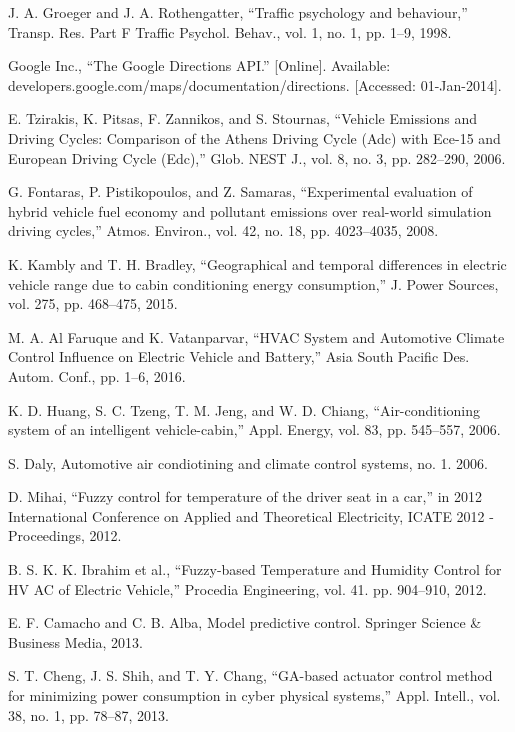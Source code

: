 J. A. Groeger and J. A. Rothengatter, “Traffic psychology and behaviour,” Transp. Res. Part F Traffic Psychol. Behav., vol. 1, no. 1, pp. 1–9, 1998.

Google Inc., “The Google Directions API.” [Online]. Available: developers.google.com/maps/documentation/directions. [Accessed: 01-Jan-2014].

E. Tzirakis, K. Pitsas, F. Zannikos, and S. Stournas, “Vehicle Emissions and Driving Cycles: Comparison of the Athens Driving Cycle (Adc) with Ece-15 and European Driving Cycle (Edc),” Glob. NEST J., vol. 8, no. 3, pp. 282–290, 2006.

G. Fontaras, P. Pistikopoulos, and Z. Samaras, “Experimental evaluation of hybrid vehicle fuel economy and pollutant emissions over real-world simulation driving cycles,” Atmos. Environ., vol. 42, no. 18, pp. 4023–4035, 2008.

K. Kambly and T. H. Bradley, “Geographical and temporal differences in electric vehicle range due to cabin conditioning energy consumption,” J. Power Sources, vol. 275, pp. 468–475, 2015.

M. A. Al Faruque and K. Vatanparvar, “HVAC System and Automotive Climate Control Influence on Electric Vehicle and Battery,” Asia South Pacific Des. Autom. Conf., pp. 1–6, 2016.

K. D. Huang, S. C. Tzeng, T. M. Jeng, and W. D. Chiang, “Air-conditioning system of an intelligent vehicle-cabin,” Appl. Energy, vol. 83, pp. 545–557, 2006.

S. Daly, Automotive air condiotining and climate control systems, no. 1. 2006.

	D. Mihai, “Fuzzy control for temperature of the driver seat in a car,” in 2012 International Conference on Applied and Theoretical Electricity, ICATE 2012 - Proceedings, 2012.

	B. S. K. K. Ibrahim et al., “Fuzzy-based Temperature and Humidity Control for HV AC of Electric Vehicle,” Procedia Engineering, vol. 41. pp. 904–910, 2012.

	E. F. Camacho and C. B. Alba, Model predictive control. Springer Science \& Business Media, 2013.

	S. T. Cheng, J. S. Shih, and T. Y. Chang, “GA-based actuator control method for minimizing power consumption in cyber physical systems,” Appl. Intell., vol. 38, no. 1, pp. 78–87, 2013.

